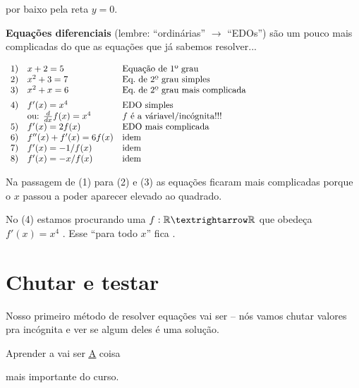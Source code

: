 \documentclass[oneside,12pt]{article}
\begin{document}
por baixo pela reta $y=0$.

\newpage

{\bf Equações diferenciais} (lembre: ``ordinárias'' $→$ ``EDOs'') são
um pouco mais complicadas do que as equações que já sabemos
resolver...

\def\te{\text}

\msk

$\scalebox{0.90}{$
\begin{array}{rll}
 1) & x+2   = 5                   & \te{Equação de 1º grau} \\
 2) & x^2+3 = 7                   & \te{Eq.\ de 2º grau simples} \\
 3) & x^2+x = 6                   & \te{Eq.\ de 2º grau mais complicada} \\[5pt]
 4) & f'(x) = x^4                 & \te{EDO simples} \\
    & \text{ou: } \ddx f(x) = x^4 & \te{$f$ é a váriavel/incógnita!!!} \\
 5) & f'(x) = 2f(x)               & \te{EDO mais complicada} \\
 6) & f''(x) + f'(x) = 6f(x)      & \te{idem} \\
 7) & f'(x) = -1/f(x)             & \te{idem} \\
 8) & f'(x) = -x/f(x)             & \te{idem} \\
 \end{array}
 $}
$

\msk

Na passagem de (1) para (2) e (3) as equações ficaram mais complicadas
porque o $x$ passou a poder aparecer elevado ao quadrado.

No (4) estamos procurando uma  $f:\R→\R$ que obedeça
$f'(x) = x^4$ . Esse ``para todo $x$'' fica
.

\newpage

\section{Chutar e testar}

Nosso primeiro método de resolver equações vai ser  -- nós vamos chutar valores pra incógnita e ver se algum
deles é uma solução.

\begin{center}

\bf\Large

Aprender a  vai ser
\underline{\underline{\underline{A}}} coisa

mais importante do curso.

\end{center}
\end{document}
